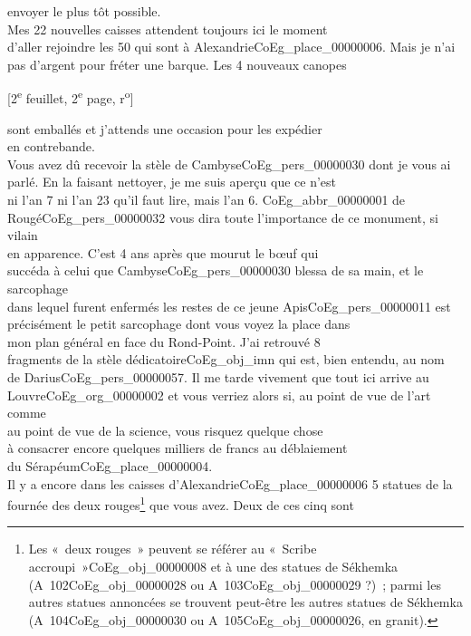 \documentclass{book}
\begin{document}
envoyer le plus tôt possible.\\
\indent Mes 22 nouvelles caisses attendent toujours ici le moment\\
d’aller rejoindre les 50 qui sont à Alexandrie\gls{CoEg_place_00000006}. Mais je n’ai\\
pas d’argent pour fréter une barque. Les 4 nouveaux canopes
{\footnotesize\begin{center} {[2\textsuperscript{e} feuillet, 2\textsuperscript{e} page, r\textsuperscript{o}]}\end{center}}
\noindent sont emballés et j’attends une occasion pour les expédier\\
en contrebande.\\
\indent Vous avez dû recevoir la stèle de Cambyse\gls{CoEg_pers_00000030} dont je vous ai\\
parlé. En la faisant nettoyer, je me suis aperçu que ce n’est\\
ni l’an 7 ni l’an 23 qu’il faut lire, mais l’an 6. \gls{CoEg_abbr_00000001} de\\
Rougé\gls{CoEg_pers_00000032} vous dira toute l’importance de ce monument, si vilain\\
en apparence. C’est 4 ans après que mourut le bœuf qui\\
succéda à celui que Cambyse\gls{CoEg_pers_00000030} blessa de sa main, et le sarcophage\\
dans lequel furent enfermés les restes de ce jeune Apis\gls{CoEg_pers_00000011} est\\
précisément le petit sarcophage dont vous voyez la place dans\\
mon plan général en face du Rond-Point. J’ai retrouvé 8\\
fragments de la stèle dédicatoire\gls{CoEg_obj_imn} qui est, bien entendu, au nom\\
de Darius\gls{CoEg_pers_00000057}. Il me tarde vivement que tout ici arrive au\\
Louvre\gls{CoEg_org_00000002} et vous verriez alors si, au point de vue de l’art comme\\
au point de vue de la science, vous risquez quelque chose\\
à consacrer encore quelques milliers de francs au déblaiement\\
du Sérapéum\gls{CoEg_place_00000004}.\\
\indent Il y a encore dans les caisses d’Alexandrie\gls{CoEg_place_00000006} 5 statues de la\\
fournée des deux rouges\footnote{Les «~deux rouges~» peuvent se référer au «~Scribe accroupi~»\gls{CoEg_obj_00000008} et à une des statues de Sékhemka (A~102\gls{CoEg_obj_00000028} ou A~103\gls{CoEg_obj_00000029} ?)~; parmi les autres statues annoncées se trouvent peut-être les autres statues de Sékhemka (A~104\gls{CoEg_obj_00000030} ou A~105\gls{CoEg_obj_00000026}, en granit).} que vous avez. Deux de ces cinq sont\\
\end{document}
